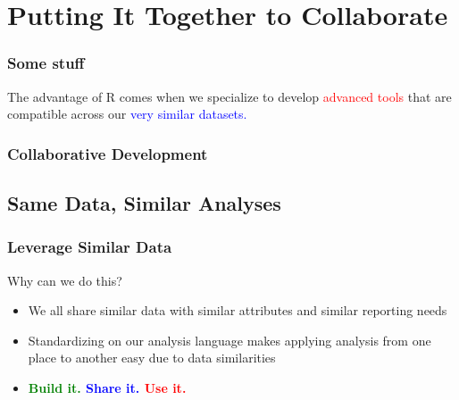 \documentclass[12pt,handout]{beamer}
\begin{document}
\section{Putting It Together to Collaborate}

\begin{frame}
\frametitle{Some stuff}
The advantage of R comes when we specialize to develop \textcolor{red}{advanced tools} that are compatible across our \textcolor{blue}{very similar datasets.} 
\end{frame}


{
\begin{frame}[plain]
\frametitle{Collaborative Development}
\end{frame}
}


\subsection{Same Data, Similar Analyses}

\begin{frame}
\frametitle{Leverage Similar Data}
\Large Why can we do this?
\begin{itemize}
  \item We all share similar data with similar attributes and similar reporting needs
  \item Standardizing on our analysis language makes applying analysis from one place to another easy due to data similarities
  \item \Large \textbf{\textcolor{green}{Build it.} \textcolor{blue}{Share it.} \textcolor{red}{Use it.}}
\end{itemize}
\end{frame}
\end{document}
